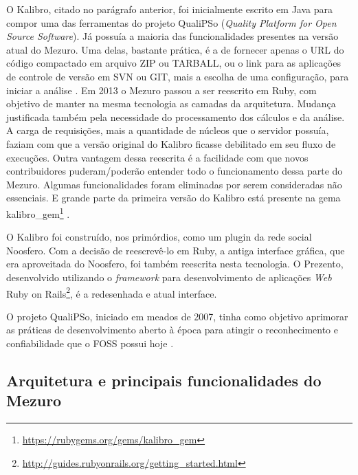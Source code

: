 O Kalibro, citado no parágrafo anterior, foi inicialmente escrito em Java para
compor uma das ferramentas do projeto QualiPSo (\textit{Quality Platform for
Open Source Software}). Já possuía a maioria das funcionalidades presentes na
versão atual do Mezuro. Uma delas, bastante prática, é a de fornecer apenas o
URL do código compactado em arquivo ZIP ou TARBALL, ou o link para as
aplicações de controle de versão em SVN ou GIT, mais a escolha de uma
configuração, para iniciar a análise \cite{camarinhaOSS2015}. Em 2013 o Mezuro
passou a ser reescrito em Ruby, com objetivo de manter na mesma tecnologia as
camadas da arquitetura. Mudança justificada também pela necessidade do
processamento dos cálculos e da análise. A carga de requisições, mais a
quantidade de núcleos que o servidor possuía, faziam com que a versão original
do Kalibro ficasse debilitado em seu fluxo de execuções. Outra vantagem dessa
reescrita é a facilidade com que novos contribuidores puderam/poderão entender
todo o funcionamento dessa parte do Mezuro. Algumas funcionalidades foram
eliminadas por serem consideradas não essenciais. E grande parte da primeira
versão do Kalibro está presente na gema
kalibro\_gem\footnote{\url{https://rubygems.org/gems/kalibro_gem}}
\cite{meirellesCibse2015}.



O Kalibro foi construído, nos primórdios, como um plugin da rede social
Noosfero. Com a decisão de reescrevê-lo em Ruby, a antiga interface gráfica,
que era aproveitada do Noosfero, foi também reescrita nesta
tecnologia. O Prezento, desenvolvido utilizando o \textit{framework} para
desenvolvimento de aplicações \textit{Web}
Ruby on Rails\footnote{\url{http://guides.rubyonrails.org/getting_started.html}},
é a redesenhada e atual interface.



O projeto QualiPSo, iniciado em meados de 2007, tinha como objetivo aprimorar
as práticas de desenvolvimento aberto à época para atingir o reconhecimento e
confiabilidade que o FOSS possui hoje \cite{messias2012}.

\subsection{Arquitetura e principais funcionalidades do Mezuro}

